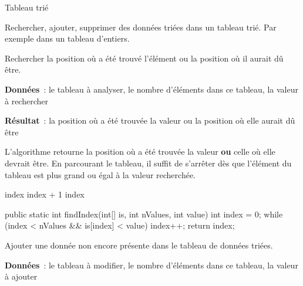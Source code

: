 \begin{Fiche}{Tableau trié}
\label{fiche:tab-recherche-triee}

	
	Rechercher, ajouter, supprimer des données triées dans un tableau trié. Par
	exemple dans un tableau d'entiers. 



	Rechercher la position où a été trouvé l’élément ou la position où il aurait
	dû être.
	
	\textbf{Données}~: le tableau à analyser, le nombre d'éléments dans ce
	tableau, la valeur à rechercher
		
	\textbf{Résultat}~: la position où a été trouvée la valeur ou la position où
	elle aurait dû être


	L'algorithme retourne la position où a été trouvée la valeur \textbf{ou}
	celle où elle devrait être. En parcourant le tableau, il suffit de
	s'arrêter dès que l'élément du tableau est plus grand ou égal à la valeur
	recherchée. 

		\begin{pseudocode}
					 
						\Let index \Gets index + 1
					\EndWhile
					\Return index
				\EndAlgo
		\end{pseudocode}

		\begin{java}
public static int findIndex(int[] is, int nValues, int value){
	int index = 0;
	while (index < nValues && is[index] < value){
		index++;
	}
	return index;
}
		\end{java}



	
	Ajouter une donnée non encore présente dans le tableau de données triées.
	
	\textbf{Données}~: le tableau à modifier, le nombre d'éléments dans ce
	tableau, la valeur à ajouter
		

\end{Fiche}
